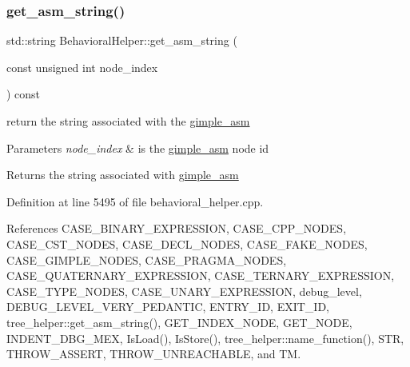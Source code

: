 \subsubsection{\texorpdfstring{get\+\_\+asm\+\_\+string()}{get\_asm\_string()}}
{\footnotesize\ttfamily std\+::string Behavioral\+Helper\+::get\+\_\+asm\+\_\+string (\begin{DoxyParamCaption}\item[{const unsigned int}]{node\+\_\+index }\end{DoxyParamCaption}) const}



return the string associated with the \hyperlink{structgimple__asm}{gimple\+\_\+asm} 


\begin{DoxyParams}{Parameters}
{\em node\+\_\+index} & is the \hyperlink{structgimple__asm}{gimple\+\_\+asm} node id \\
\hline
\end{DoxyParams}
\begin{DoxyReturn}{Returns}
the string associated with \hyperlink{structgimple__asm}{gimple\+\_\+asm} 
\end{DoxyReturn}


Definition at line 5495 of file behavioral\+\_\+helper.\+cpp.



References C\+A\+S\+E\+\_\+\+B\+I\+N\+A\+R\+Y\+\_\+\+E\+X\+P\+R\+E\+S\+S\+I\+ON, C\+A\+S\+E\+\_\+\+C\+P\+P\+\_\+\+N\+O\+D\+ES, C\+A\+S\+E\+\_\+\+C\+S\+T\+\_\+\+N\+O\+D\+ES, C\+A\+S\+E\+\_\+\+D\+E\+C\+L\+\_\+\+N\+O\+D\+ES, C\+A\+S\+E\+\_\+\+F\+A\+K\+E\+\_\+\+N\+O\+D\+ES, C\+A\+S\+E\+\_\+\+G\+I\+M\+P\+L\+E\+\_\+\+N\+O\+D\+ES, C\+A\+S\+E\+\_\+\+P\+R\+A\+G\+M\+A\+\_\+\+N\+O\+D\+ES, C\+A\+S\+E\+\_\+\+Q\+U\+A\+T\+E\+R\+N\+A\+R\+Y\+\_\+\+E\+X\+P\+R\+E\+S\+S\+I\+ON, C\+A\+S\+E\+\_\+\+T\+E\+R\+N\+A\+R\+Y\+\_\+\+E\+X\+P\+R\+E\+S\+S\+I\+ON, C\+A\+S\+E\+\_\+\+T\+Y\+P\+E\+\_\+\+N\+O\+D\+ES, C\+A\+S\+E\+\_\+\+U\+N\+A\+R\+Y\+\_\+\+E\+X\+P\+R\+E\+S\+S\+I\+ON, debug\+\_\+level, D\+E\+B\+U\+G\+\_\+\+L\+E\+V\+E\+L\+\_\+\+V\+E\+R\+Y\+\_\+\+P\+E\+D\+A\+N\+T\+IC, E\+N\+T\+R\+Y\+\_\+\+ID, E\+X\+I\+T\+\_\+\+ID, tree\+\_\+helper\+::get\+\_\+asm\+\_\+string(), G\+E\+T\+\_\+\+I\+N\+D\+E\+X\+\_\+\+N\+O\+DE, G\+E\+T\+\_\+\+N\+O\+DE, I\+N\+D\+E\+N\+T\+\_\+\+D\+B\+G\+\_\+\+M\+EX, Is\+Load(), Is\+Store(), tree\+\_\+helper\+::name\+\_\+function(), S\+TR, T\+H\+R\+O\+W\+\_\+\+A\+S\+S\+E\+RT, T\+H\+R\+O\+W\+\_\+\+U\+N\+R\+E\+A\+C\+H\+A\+B\+LE, and TM.



